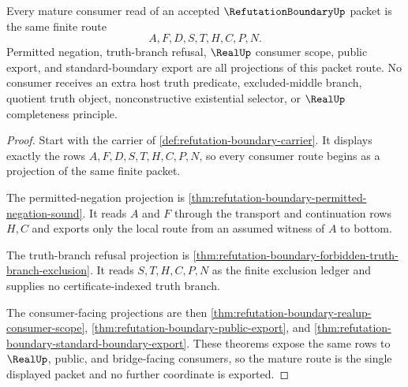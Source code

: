 \begin{theorem}
\label{thm:refutation-boundary-mature-consumer-route}
Every mature consumer read of an accepted $\RefutationBoundaryUp$ packet is the same finite route
$$
A,F,D,S,T,H,C,P,N .
$$
Permitted negation, truth-branch refusal, $\RealUp$ consumer scope, public export, and standard-boundary export are all projections of this packet route. No consumer receives an extra host truth predicate, excluded-middle branch, quotient truth object, nonconstructive existential selector, or $\RealUp$ completeness principle.
\end{theorem}
\begin{proof}
Start with the carrier of \autoref{def:refutation-boundary-carrier}. It displays exactly the rows $A,F,D,S,T,H,C,P,N$, so every consumer route begins as a projection of the same finite packet.

The permitted-negation projection is \autoref{thm:refutation-boundary-permitted-negation-sound}. It reads $A$ and $F$ through the transport and continuation rows $H,C$ and exports only the local route from an assumed witness of $A$ to bottom.

The truth-branch refusal projection is \autoref{thm:refutation-boundary-forbidden-truth-branch-exclusion}. It reads $S,T,H,C,P,N$ as the finite exclusion ledger and supplies no certificate-indexed truth branch.

The consumer-facing projections are then \autoref{thm:refutation-boundary-realup-consumer-scope}, \autoref{thm:refutation-boundary-public-export}, and \autoref{thm:refutation-boundary-standard-boundary-export}. These theorems expose the same rows to $\RealUp$, public, and bridge-facing consumers, so the mature route is the single displayed packet and no further coordinate is exported.
\end{proof}


